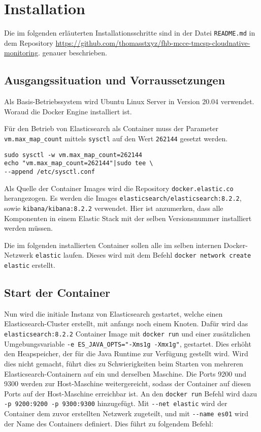 \section{Installation}
Die im folgenden erläuterten Installationsschritte
sind in der Datei \verb|README.md| in dem Repository
\url{https://github.com/thomasstxyz/fhb-mcce-tmcsp-cloudnative-monitoring}.
genauer beschrieben.

\subsection{Ausgangssituation und Vorraussetzungen}
Als Basis-Betriebssystem wird Ubuntu Linux Server 
in Version 20.04 \cite{ubuntuServerWebsite} verwendet.
Woraud die Docker Engine \cite{dockerEngineWebsite} installiert ist.

Für den Betrieb von Elasticsearch als Container muss der 
Parameter \verb|vm.max_map_count| mittels \verb|sysctl| 
auf den Wert \verb|262144| gesetzt werden.

\begin{verbatim}
sudo sysctl -w vm.max_map_count=262144
echo "vm.max_map_count=262144"|sudo tee \
--append /etc/sysctl.conf
\end{verbatim}

Als Quelle der Container Images wird die Repository
\verb|docker.elastic.co| herangezogen.
Es werden die Images \verb|elasticsearch/elasticsearch:8.2.2|, sowie
\verb|kibana/kibana:8.2.2| verwendet.
Hier ist anzumerken, dass alle Komponenten in einem
Elastic Stack mit der selben Versionsnummer installiert werden
müssen.

Die im folgenden installierten Container sollen alle 
im selben internen Docker-Netzwerk \verb|elastic| laufen.
Dieses wird mit dem Befehl
\verb|docker network create elastic| erstellt.


\subsection{Start der Container}
Nun wird die initiale Instanz von Elasticsearch gestartet, 
welche einen Elasticsearch-Cluster erstellt, mit anfangs
noch einem Knoten.
Dafür wird das \verb|elasticsearch:8.2.2| Container Image
mit \verb|docker run| und einer zusätzlichen Umgebungsvariable 
\verb|-e ES_JAVA_OPTS="-Xms1g -Xmx1g"|,
gestartet. Dies erhöht den Heapspeicher, der für die 
Java Runtime zur Verfügung gestellt wird. 
Wird dies nicht gemacht, führt dies zu Schwierigkeiten
beim Starten von mehreren Elasticsearch-Containern 
auf ein und derselben Maschine.
Die Ports 9200 und 9300 werden zur Host-Maschine weitergereicht,
sodass der Container auf diesen Ports auf der Host-Maschine
erreichbar ist. An den \verb|docker run| Befehl wird 
dazu \verb|-p 9200:9200 -p 9300:9300| hinzugefügt.
Mit \verb|--net elastic| wird der Container dem zuvor erstellten
Netzwerk zugeteilt, und mit \verb|--name es01| wird der Name 
des Containers definiert. 
Dies führt zu folgendem Befehl:

